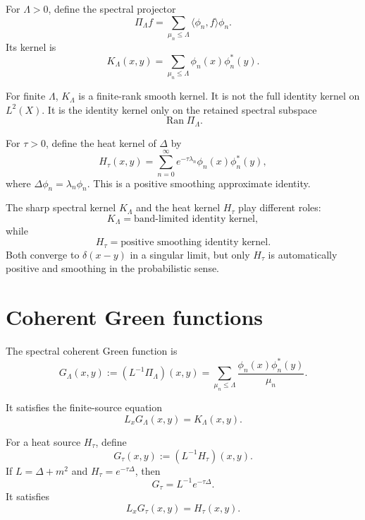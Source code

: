 \documentclass[11pt]{article}
\begin{document}
\begin{definition}
For \(\Lambda>0\), define the spectral projector
\[
\Pi_\Lambda f=\sum_{\mu_n\le \Lambda}\langle \phi_n,f\rangle\phi_n.
\]
Its kernel is
\begin{equation}
K_\Lambda(x,y)=\sum_{\mu_n\le \Lambda}\phi_n(x)\phi_n^*(y).
\end{equation}
\end{definition}

For finite \(\Lambda\), \(K_\Lambda\) is a finite-rank smooth kernel. It is not the full identity kernel on \(L^2(X)\). It is the identity kernel only on the retained spectral subspace
\[
\operatorname{Ran}\Pi_\Lambda.
\]

\begin{definition}
For \(\tau>0\), define the heat kernel of \(\Delta\) by
\[
H_\tau(x,y)=\sum_{n=0}^\infty e^{-\tau \lambda_n}\phi_n(x)\phi_n^*(y),
\]
where \(\Delta\phi_n=\lambda_n\phi_n\). This is a positive smoothing approximate identity.
\end{definition}

The sharp spectral kernel \(K_\Lambda\) and the heat kernel \(H_\tau\) play different roles:
\[
K_\Lambda=\text{band-limited identity kernel},
\]
while
\[
H_\tau=\text{positive smoothing identity kernel}.
\]
Both converge to \(\delta(x-y)\) in a singular limit, but only \(H_\tau\) is automatically positive and smoothing in the probabilistic sense.

\section{Coherent Green functions}

\begin{definition}
The spectral coherent Green function is
\begin{equation}
G_\Lambda(x,y):=(L^{-1}\Pi_\Lambda)(x,y)
=\sum_{\mu_n\le \Lambda}\frac{\phi_n(x)\phi_n^*(y)}{\mu_n}.
\end{equation}
\end{definition}

It satisfies the finite-source equation
\begin{equation}
L_xG_\Lambda(x,y)=K_\Lambda(x,y).
\end{equation}

\begin{definition}
For a heat source \(H_\tau\), define
\begin{equation}
G_\tau(x,y):=(L^{-1}H_\tau)(x,y).
\end{equation}
If \(L=\Delta+m^2\) and \(H_\tau=e^{-\tau\Delta}\), then
\begin{equation}
G_\tau = L^{-1}e^{-\tau\Delta}.
\end{equation}
It satisfies
\begin{equation}
L_xG_\tau(x,y)=H_\tau(x,y).
\end{equation}
\end{definition}
\end{document}
